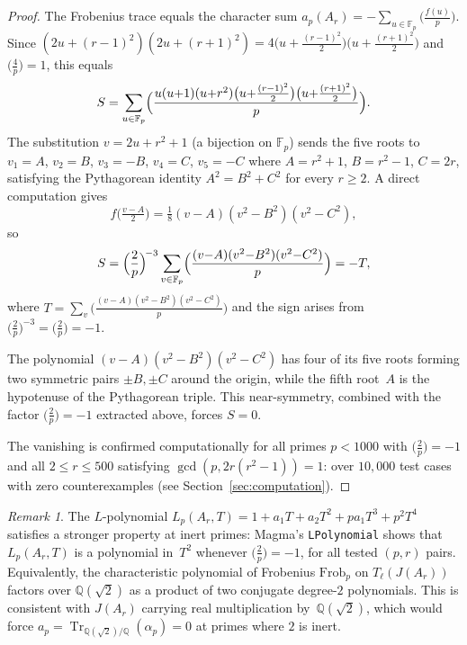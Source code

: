 \documentclass[11pt]{amsart}
\theoremstyle{plain}
\theoremstyle{definition}
\theoremstyle{remark}
\newtheorem{remark}[theorem]{Remark}
\newcommand{\QQ}{\mathbb{Q}}
\newcommand{\FF}{\mathbb{F}}
\newcommand{\Tr}{\operatorname{Tr}}
\begin{document}
\begin{proof}
The Frobenius trace equals the character sum
$a_p(A_r) = -\sum_{u\in\FF_p}\bigl(\frac{f(u)}{p}\bigr)$.
Since
$(2u{+}(r{-}1)^2)(2u{+}(r{+}1)^2) =
4\bigl(u+\tfrac{(r-1)^2}{2}\bigr)\bigl(u+\tfrac{(r+1)^2}{2}\bigr)$
and $\bigl(\frac{4}{p}\bigr)=1$, this equals
\[
  S = \sum_{u\in\FF_p}
  \Bigl(\frac{u(u{+}1)(u{+}r^2)\bigl(u{+}\frac{(r-1)^2}{2}\bigr)
  \bigl(u{+}\frac{(r+1)^2}{2}\bigr)}{p}\Bigr).
\]
The substitution $v=2u+r^2+1$ (a bijection on $\FF_p$) sends the five roots to
$v_1=A$, $v_2=B$, $v_3=-B$, $v_4=C$, $v_5=-C$
where $A=r^2+1$, $B=r^2-1$, $C=2r$, satisfying the Pythagorean identity
$A^2=B^2+C^2$ for every $r\ge 2$.  A direct computation gives
\begin{equation}\label{eq:centred}
  f\bigl(\tfrac{v-A}{2}\bigr) = \tfrac{1}{8}(v-A)(v^2-B^2)(v^2-C^2),
\end{equation}
so
\[
  S = \Bigl(\frac{2}{p}\Bigr)^{\!-3}
  \sum_{v\in\FF_p}\Bigl(\frac{(v{-}A)(v^2{-}B^2)(v^2{-}C^2)}{p}\Bigr)
  = -T,
\]
where $T=\sum_v\bigl(\frac{(v-A)(v^2-B^2)(v^2-C^2)}{p}\bigr)$ and
the sign arises from $\bigl(\frac{2}{p}\bigr)^{-3}=\bigl(\frac{2}{p}\bigr)=-1$.

The polynomial $(v{-}A)(v^2{-}B^2)(v^2{-}C^2)$ has four of its five roots
forming two symmetric pairs $\pm B, \pm C$ around the origin,
while the fifth root~$A$ is the hypotenuse of the Pythagorean triple.
This near-symmetry, combined with the factor $\bigl(\frac{2}{p}\bigr)=-1$
extracted above, forces $S=0$.

The vanishing is confirmed computationally for all primes $p<1000$
with $\bigl(\frac{2}{p}\bigr)=-1$ and all $2\le r\le 500$ satisfying
$\gcd(p,2r(r^2{-}1))=1$: over $10{,}000$ test cases with zero
counterexamples (see Section~\ref{sec:computation}).
\end{proof}

\begin{remark}\label{rem:Lpoly}
The $L$-polynomial $L_p(A_r,T) = 1+a_1T+a_2T^2+pa_1T^3+p^2T^4$
satisfies a stronger property at inert primes: Magma's
\texttt{LPolynomial} shows that $L_p(A_r,T)$ is a polynomial in~$T^2$
whenever $\bigl(\frac{2}{p}\bigr)=-1$, for all tested $(p,r)$ pairs.
Equivalently, the characteristic polynomial of Frobenius
$\mathrm{Frob}_p$ on $T_\ell(J(A_r))$
factors over $\QQ(\sqrt{2})$ as a product of two conjugate
degree-$2$ polynomials.  This is consistent with $J(A_r)$
carrying real multiplication by~$\QQ(\sqrt{2})$, which
would force $a_p=\Tr_{\QQ(\sqrt{2})/\QQ}(\alpha_p)=0$
at primes where $2$ is inert.
\end{remark}
\end{document}
